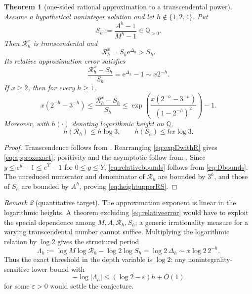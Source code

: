 \documentclass[11pt]{article}
\numberwithin{equation}{section}
\newtheorem{theorem}{Theorem}[section]
\theoremstyle{definition}
\theoremstyle{remark}
\newtheorem{remark}[theorem]{Remark}
\newcommand{\Q}{\mathbb Q}
\newcommand{\e}{\mathrm e}
\begin{document}
\begin{theorem}[one-sided rational approximation to a transcendental power]\label{thm:transapprox}
Assume a hypothetical noninteger solution and let $h\notin\{1,2,4\}$.  Put
\begin{equation}\label{eq:Sh}
  S_h:=\frac{A^h-1}{M^h-1}\in\Q_{>0}.
\end{equation}
Then $\mathcal R_h^x$ is transcendental and
\begin{equation}\label{eq:approxexact}
  \mathcal R_h^x=S_h\e^{\Delta_h}>S_h.
\end{equation}
Its relative approximation error satisfies
\begin{equation}\label{eq:relativeerror}
  \frac{\mathcal R_h^x-S_h}{S_h}
  =\e^{\Delta_h}-1
  \sim x2^{-h}.
\end{equation}
If $x\ge2$, then for every $h\ge1$,
\begin{equation}\label{eq:relativebounds}
  x(2^{-h}-3^{-h})
  \le \frac{\mathcal R_h^x-S_h}{S_h}
  \le
  \exp\!\left(\frac{x(2^{-h}-3^{-h})}{(1-2^{-h})^2}\right)-1.
\end{equation}
Moreover, with $h(\cdot)$ denoting logarithmic height on $\Q$,
\begin{equation}\label{eq:heightupperRS}
  h(\mathcal R_h)\le h\log3,
  \qquad
  h(S_h)\le hx\log3.
\end{equation}
\end{theorem}

\begin{proof}
Transcendence follows from .  Rearranging \eqref{eq:expDwithR} gives \eqref{eq:approxexact}; positivity and the asymptotic follow from .  Since $y\le e^y-1\le e^Y-1$ for $0\le y\le Y$, \eqref{eq:relativebounds} follows from \eqref{eq:Dbounds}.  The unreduced numerator and denominator of $\mathcal R_h$ are bounded by $3^h$, and those of $S_h$ are bounded by $A^h$, proving \eqref{eq:heightupperRS}.
\end{proof}

\begin{remark}[quantitative target]
The approximation exponent is linear in the logarithmic heights.  A theorem excluding \eqref{eq:relativeerror} would have to exploit the special dependence among $M,A,\mathcal R_h,S_h$; a generic irrationality measure for a varying transcendental number cannot suffice.  Multiplying the logarithmic relation by $\log2$ gives the structured period
\begin{equation}\label{eq:LambdaH}
  \Lambda_h
  :=\log M\log\mathcal R_h-\log2\log S_h
  =\log2\,\Delta_h
  \sim x\log2\,2^{-h}.
\end{equation}
Thus the exact threshold in the depth variable is $\log2$: any nonintegrality-sensitive lower bound with
\[
  -\log|\Lambda_h|\le(\log2-\varepsilon)h+O(1)
\]
for some $\varepsilon>0$ would settle the conjecture.
\end{remark}
\end{document}
